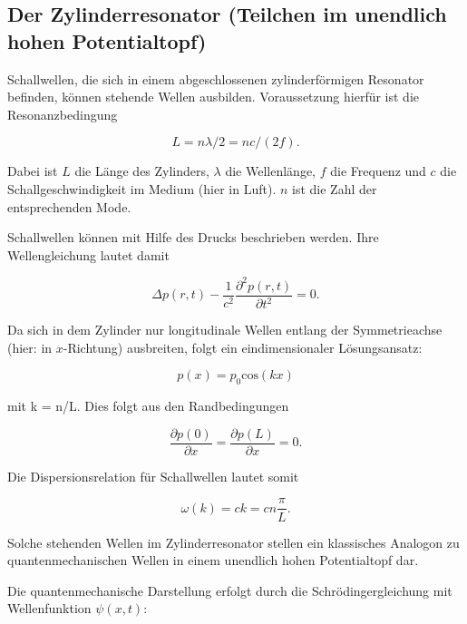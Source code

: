 \subsection{Der Zylinderresonator (Teilchen im unendlich hohen Potentialtopf)}

Schallwellen, die sich in einem abgeschlossenen zylinderförmigen Resonator befinden, können stehende Wellen ausbilden.
Voraussetzung hierfür ist die Resonanzbedingung

\begin{equation}
  L = n \lambda/2 = nc/(2f) .
\end{equation}

Dabei ist $L$ die Länge des Zylinders, $\lambda$ die Wellenlänge, $f$ die Frequenz und $c$ die Schallgeschwindigkeit im Medium
(hier in Luft). $n$ ist die Zahl der entsprechenden Mode.

Schallwellen können mit Hilfe des Drucks beschrieben werden. Ihre Wellengleichung lautet damit

\begin{equation}
  \Delta p(r,t) - \frac{1}{c^2} \frac{\partial^2 p(r,t)}{\partial t^2} = 0 .
  \label{eq:wellengl}
\end{equation}

Da sich in dem Zylinder nur longitudinale Wellen entlang der Symmetrieachse (hier: in $x$-Richtung) ausbreiten,
folgt ein eindimensionaler Lösungsansatz:

\begin{equation}
  p(x) = p_0 \text{cos}(kx)
\end{equation}

mit k = n\pi/L. Dies folgt aus den Randbedingungen

\begin{equation}
  \frac{\partial p(0)}{\partial x} = \frac{\partial p(L)}{\partial x} = 0 .
\end{equation}

Die Dispersionsrelation für Schallwellen lautet somit

\begin{equation}
  \omega(k) = ck = cn\frac{\pi}{L} .
\end{equation}

Solche stehenden Wellen im Zylinderresonator stellen ein klassisches Analogon zu quantenmechanischen Wellen in einem
unendlich hohen Potentialtopf dar.

Die quantenmechanische Darstellung erfolgt durch die Schrödingergleichung mit Wellenfunktion $\psi(x,t)$:

